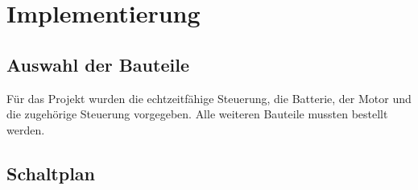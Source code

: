 \chapter{Implementierung}
\label{chapter:Implementierung}






\section{Auswahl der Bauteile}
\label{section:Auswahl_der_Bauteile}


Für das Projekt wurden die echtzeitfähige Steuerung, die Batterie, der Motor und die zugehörige Steuerung vorgegeben. Alle weiteren Bauteile mussten bestellt werden.






\section{Schaltplan}
\label{section:Schaltplan}



